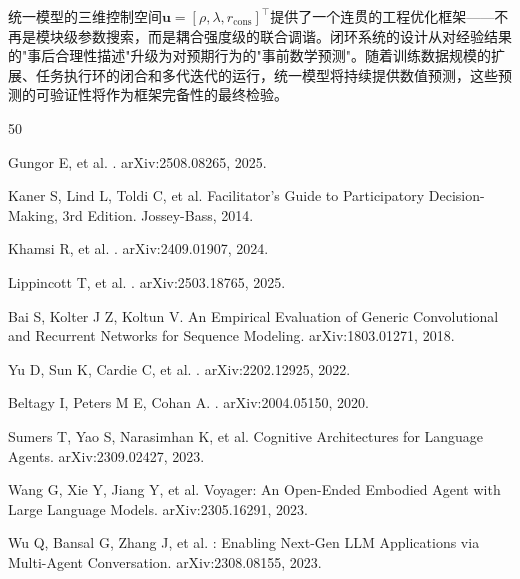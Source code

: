 \documentclass[twocolumn,10.5pt]{ctexart}
\begin{document}
统一模型的三维控制空间$\mathbf{u} = [\rho, \lambda, r_{\text{cons}}]^\top$提供了一个连贯的工程优化框架——不再是模块级参数搜索，而是耦合强度级的联合调谐。闭环系统的设计从对经验结果的"事后合理性描述"升级为对预期行为的"事前数学预测"。随着训练数据规模的扩展、任务执行环的闭合和多代迭代的运行，统一模型将持续提供数值预测，这些预测的可验证性将作为框架完备性的最终检验。

\begin{thebibliography}{50}

Gungor E, et al.
.
\newblock arXiv:2508.08265, 2025.

Kaner S, Lind L, Toldi C, et al.
\newblock Facilitator's Guide to Participatory Decision-Making, 3rd Edition.
\newblock Jossey-Bass, 2014.

Khamsi R, et al.
.
\newblock arXiv:2409.01907, 2024.

Lippincott T, et al.
.
\newblock arXiv:2503.18765, 2025.

Bai S, Kolter J Z, Koltun V.
\newblock An Empirical Evaluation of Generic Convolutional and Recurrent Networks for Sequence Modeling.
\newblock arXiv:1803.01271, 2018.

Yu D, Sun K, Cardie C, et al.
.
\newblock arXiv:2202.12925, 2022.

Beltagy I, Peters M E, Cohan A.
.
\newblock arXiv:2004.05150, 2020.

Sumers T, Yao S, Narasimhan K, et al.
\newblock Cognitive Architectures for Language Agents.
\newblock arXiv:2309.02427, 2023.

Wang G, Xie Y, Jiang Y, et al.
\newblock Voyager: An Open-Ended Embodied Agent with Large Language Models.
\newblock arXiv:2305.16291, 2023.

Wu Q, Bansal G, Zhang J, et al.
: Enabling Next-Gen LLM Applications via Multi-Agent Conversation.
\newblock arXiv:2308.08155, 2023.


\end{thebibliography}
\end{document}
